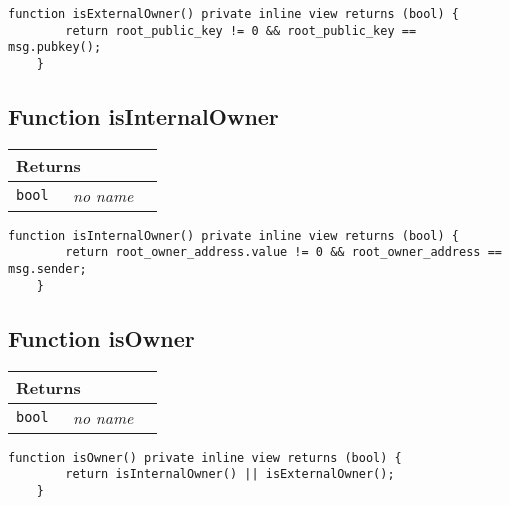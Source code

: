 \vspace{2cm}

\begin{lstlisting}[firstnumber=476]
    function isExternalOwner() private inline view returns (bool) {
        return root_public_key != 0 && root_public_key == msg.pubkey();
    }
\end{lstlisting}

\subsection{Function isInternalOwner}


\ifsoltables
\noindent\begin{tabular}{|l|l|p{5cm}|}\hline
\multicolumn{3}{|l|}{\bf Returns}\\\hline
\tt bool & {\em no name} &\\\hline
\end{tabular}
\fi

\vspace{2cm}

\begin{lstlisting}[firstnumber=472]
    function isInternalOwner() private inline view returns (bool) {
        return root_owner_address.value != 0 && root_owner_address == msg.sender;
    }
\end{lstlisting}

\subsection{Function isOwner}


\ifsoltables
\noindent\begin{tabular}{|l|l|p{5cm}|}\hline
\multicolumn{3}{|l|}{\bf Returns}\\\hline
\tt bool & {\em no name} &\\\hline
\end{tabular}
\fi

\vspace{2cm}

\begin{lstlisting}[firstnumber=468]
    function isOwner() private inline view returns (bool) {
        return isInternalOwner() || isExternalOwner();
    }
\end{lstlisting}
